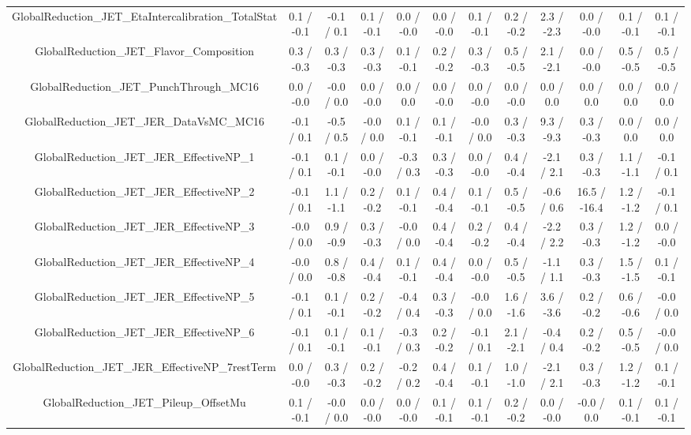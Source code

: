 \begin{table}[htbp]
\begin{center}
\begin{tabular}{|c|c|c|c|c|c|c|c|c|c|c|c|}
  GlobalReduction_JET_EtaIntercalibration_TotalStat & 0.1 / -0.1 & -0.1 / 0.1 & 0.1 / -0.1 & 0.0 / -0.0 & 0.0 / -0.0 & 0.1 / -0.1 & 0.2 / -0.2 & 2.3 / -2.3 & 0.0 / -0.0 & 0.1 / -0.1 & 0.1 / -0.1 \\ 
  GlobalReduction_JET_Flavor_Composition & 0.3 / -0.3 & 0.3 / -0.3 & 0.3 / -0.3 & 0.1 / -0.1 & 0.2 / -0.2 & 0.3 / -0.3 & 0.5 / -0.5 & 2.1 / -2.1 & 0.0 / -0.0 & 0.5 / -0.5 & 0.5 / -0.5 \\ 
  GlobalReduction_JET_PunchThrough_MC16 & 0.0 / -0.0 & -0.0 / 0.0 & 0.0 / -0.0 & 0.0 / 0.0 & 0.0 / -0.0 & 0.0 / -0.0 & 0.0 / -0.0 & 0.0 / 0.0 & 0.0 / 0.0 & 0.0 / 0.0 & 0.0 / 0.0 \\ 
  GlobalReduction_JET_JER_DataVsMC_MC16 & -0.1 / 0.1 & -0.5 / 0.5 & -0.0 / 0.0 & 0.1 / -0.1 & 0.1 / -0.1 & -0.0 / 0.0 & 0.3 / -0.3 & 9.3 / -9.3 & 0.3 / -0.3 & 0.0 / 0.0 & 0.0 / 0.0 \\ 
  GlobalReduction_JET_JER_EffectiveNP_1 & -0.1 / 0.1 & 0.1 / -0.1 & 0.0 / -0.0 & -0.3 / 0.3 & 0.3 / -0.3 & 0.0 / -0.0 & 0.4 / -0.4 & -2.1 / 2.1 & 0.3 / -0.3 & 1.1 / -1.1 & -0.1 / 0.1 \\ 
  GlobalReduction_JET_JER_EffectiveNP_2 & -0.1 / 0.1 & 1.1 / -1.1 & 0.2 / -0.2 & 0.1 / -0.1 & 0.4 / -0.4 & 0.1 / -0.1 & 0.5 / -0.5 & -0.6 / 0.6 & 16.5 / -16.4 & 1.2 / -1.2 & -0.1 / 0.1 \\ 
  GlobalReduction_JET_JER_EffectiveNP_3 & -0.0 / 0.0 & 0.9 / -0.9 & 0.3 / -0.3 & -0.0 / 0.0 & 0.4 / -0.4 & 0.2 / -0.2 & 0.4 / -0.4 & -2.2 / 2.2 & 0.3 / -0.3 & 1.2 / -1.2 & 0.0 / -0.0 \\ 
  GlobalReduction_JET_JER_EffectiveNP_4 & -0.0 / 0.0 & 0.8 / -0.8 & 0.4 / -0.4 & 0.1 / -0.1 & 0.4 / -0.4 & 0.0 / -0.0 & 0.5 / -0.5 & -1.1 / 1.1 & 0.3 / -0.3 & 1.5 / -1.5 & 0.1 / -0.1 \\ 
  GlobalReduction_JET_JER_EffectiveNP_5 & -0.1 / 0.1 & 0.1 / -0.1 & 0.2 / -0.2 & -0.4 / 0.4 & 0.3 / -0.3 & -0.0 / 0.0 & 1.6 / -1.6 & 3.6 / -3.6 & 0.2 / -0.2 & 0.6 / -0.6 & -0.0 / 0.0 \\ 
  GlobalReduction_JET_JER_EffectiveNP_6 & -0.1 / 0.1 & 0.1 / -0.1 & 0.1 / -0.1 & -0.3 / 0.3 & 0.2 / -0.2 & -0.1 / 0.1 & 2.1 / -2.1 & -0.4 / 0.4 & 0.2 / -0.2 & 0.5 / -0.5 & -0.0 / 0.0 \\ 
  GlobalReduction_JET_JER_EffectiveNP_7restTerm & 0.0 / -0.0 & 0.3 / -0.3 & 0.2 / -0.2 & -0.2 / 0.2 & 0.4 / -0.4 & 0.1 / -0.1 & 1.0 / -1.0 & -2.1 / 2.1 & 0.3 / -0.3 & 1.2 / -1.2 & 0.1 / -0.1 \\ 
  GlobalReduction_JET_Pileup_OffsetMu & 0.1 / -0.1 & -0.0 / 0.0 & 0.0 / -0.0 & 0.0 / -0.0 & 0.1 / -0.1 & 0.1 / -0.1 & 0.2 / -0.2 & 0.0 / -0.0 & -0.0 / 0.0 & 0.1 / -0.1 & 0.1 / -0.1 \\ 

\end{tabular}
\end{center}
\end{table}
